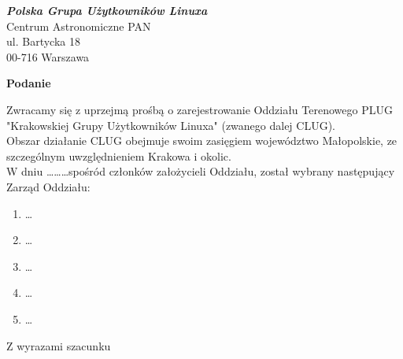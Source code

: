 \documentclass[a4paper,12pt,oneside]{letter}
\begin{document}
\date{Kraków, \today}

\begin{letter}{%
\textbf{\emph{Polska Grupa Użytkowników Linuxa}}\\
Centrum Astronomiczne PAN\\
ul. Bartycka 18\\
00-716 Warszawa\\}


\begin{center}\opening{\Large{\textbf{Podanie}}}\end{center}

Zwracamy się z uprzejmą prośbą o zarejestrowanie Oddziału Terenowego PLUG "Krakowskiej Grupy Użytkowników Linuxa" (zwanego dalej CLUG).\\
Obszar działanie CLUG obejmuje swoim zasięgiem województwo Małopolskie, ze szczególnym uwzględnieniem Krakowa i okolic.\\
W dniu \ldots \ldots\ldots spośród członków założycieli Oddziału, został wybrany następujący Zarząd Oddziału:
\begin{enumerate}
\item \ldots
\item \ldots 
\item \ldots
\item \ldots
\item \ldots
\end{enumerate}

\closing{Z wyrazami szacunku}

\end{letter}


\end{document}

